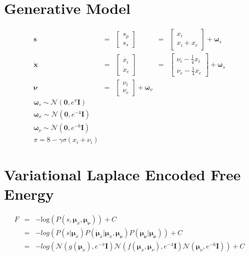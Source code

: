 \documentclass[11pt]{article}
\begin{document}
\section*{Generative Model}
$$
\begin{array}{lllll}
    \mathbf{s} &=&  \left[\begin{array}{c} s_p \\ s_s\end{array}\right] &= &
    \left[\begin{array}{c} x_i \\ x_i + x_e \end{array}\right] +
    \bm{\omega}_s \\
    \mathbf{\dot{x}} &=&  \left[\begin{array}{c} \dot{x_i} \\ \dot{x}_e
    \end{array}\right]  &=& \left[\begin{array}{c} \nu_i -\frac{1}{4}
    x_i\\ \nu_e -\frac{1}{4} x_e\end{array}\right] + \bm{\omega}_s
    \\ \bm{\nu} &=& \left[\begin{array}{c} \nu_i \\ \nu_e \end{array}\right] +
    \bm{\omega}_{\nu}\\
    \bm{\omega}_s \sim \mathcal{N}(\mathbf{0}, e^{\pi} \mathbf{I})\\
    \bm{\omega}_x \sim \mathcal{N}(\mathbf{0}, e^{-4} \mathbf{I})\\
    \bm{\omega}_\nu \sim \mathcal{N}(\mathbf{0}, e^{-6} \mathbf{I})\\
    \pi = 8-\gamma\sigma(x_i + \nu_i)
\end{array}
$$

\section*{Variational Laplace Encoded Free Energy}

$$
    \begin{array}{lll}
        F &= &-\mathrm{log}(P(s,\bm{\mu}_x, \bm{\mu}_{\bm{\nu}} )) + C \\
          &= & -log( P(s|\bm{\mu}_x) P(\dot{\bm{\mu}}_{x}|\bm{\mu}_x,
          \bm{\mu}_{\bm{\nu}}) P(\dot{\bm{\mu}}_{\bm{\nu}}|\bm{\mu}_{\bm{\nu}}))
          + C  \\
        & = & -log( \mathcal{N}( g(\bm{\mu}_x),  e^{-\pi}\mathbf{I})
        \mathcal{N}( f(\bm{\mu}_x,\bm{\mu}_\nu), e^{-4}\mathbf{I})
        \mathcal{N}(\bm{\mu}_{\nu}, e^{-6}\mathbf{I}) ) + C  \\
    \end{array}
$$
\end{document}
